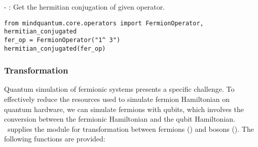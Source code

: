-  : Get the hermitian conjugation of given operator.

\begin{lstlisting}
from mindquantum.core.operators import FermionOperator, hermitian_conjugated
fer_op = FermionOperator("1^ 3")
hermitian_conjugated(fer_op)
\end{lstlisting}

\subsubsection{Transformation}
Quantum simulation of fermionic systems presents a specific challenge. To effectively reduce the resources used to simulate fermion Hamiltonian on quantum hardware, we can simulate fermions with qubits, which involves the conversion between the fermionic Hamiltonian and the qubit Hamiltonian. \MindQuantum\ supplies the module  for transformation between fermions (\FermionOperator) and bosons (\QubitOperator). The following functions are provided:
